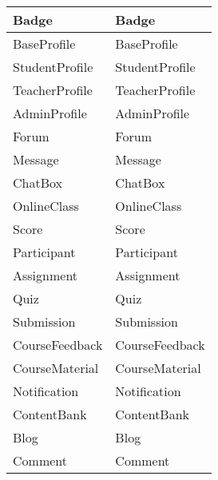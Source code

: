 \documentclass[./../main_file.tex]{subfiles}
\begin{document}
\begin{longtable}{|p{.5\linewidth}|p{.5\linewidth}|}
		Badge                      & Badge                    \\ \hline
		BaseProfile                & BaseProfile              \\ \hline
		StudentProfile             & StudentProfile           \\ \hline
		TeacherProfile             & TeacherProfile           \\ \hline
		AdminProfile               & AdminProfile             \\ \hline
		Forum                      & Forum                    \\ \hline
		Message                    & Message                  \\ \hline
		ChatBox                    & ChatBox                  \\ \hline
		OnlineClass                & OnlineClass              \\ \hline
		Score                      & Score                    \\ \hline
		Participant                & Participant              \\ \hline
		Assignment                 & Assignment               \\ \hline
		Quiz                       & Quiz                     \\ \hline
		Submission                 & Submission               \\ \hline
		CourseFeedback             & CourseFeedback           \\ \hline
		CourseMaterial             & CourseMaterial           \\ \hline
		Notification               & Notification             \\ \hline
		ContentBank                & ContentBank              \\ \hline
		Blog                       & Blog                     \\ \hline
		Comment                    & Comment                  \\ \hline
	\end{longtable}
\end{document}
